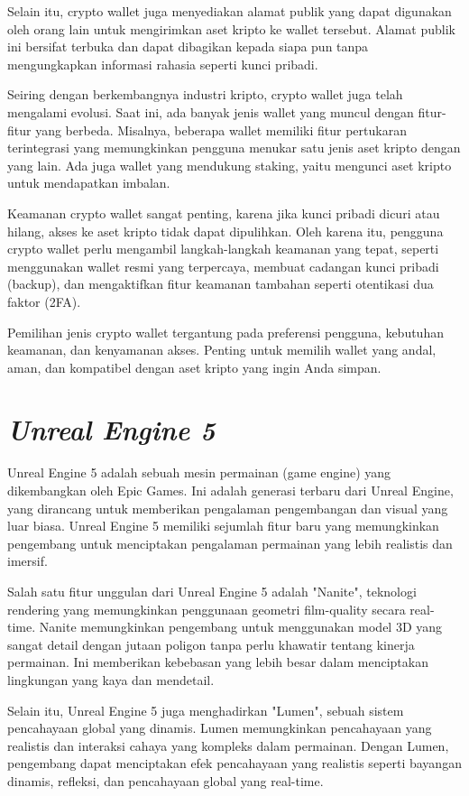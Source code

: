 Selain itu, crypto wallet juga menyediakan alamat publik yang dapat digunakan oleh orang lain untuk mengirimkan aset kripto ke wallet tersebut. Alamat publik ini bersifat terbuka dan dapat dibagikan kepada siapa pun tanpa mengungkapkan
informasi rahasia seperti kunci pribadi.

Seiring dengan berkembangnya industri kripto, crypto wallet juga telah mengalami evolusi. Saat ini, ada banyak jenis wallet yang muncul dengan fitur-fitur yang berbeda. Misalnya, beberapa wallet memiliki fitur pertukaran terintegrasi
yang memungkinkan pengguna menukar satu jenis aset kripto dengan yang lain. Ada juga wallet yang mendukung staking, yaitu mengunci aset kripto untuk mendapatkan imbalan.

Keamanan crypto wallet sangat penting, karena jika kunci pribadi dicuri atau hilang, akses ke aset kripto tidak dapat dipulihkan. Oleh karena itu, pengguna crypto wallet perlu mengambil langkah-langkah keamanan yang tepat, seperti
menggunakan wallet resmi yang terpercaya, membuat cadangan kunci pribadi (backup), dan mengaktifkan fitur keamanan tambahan seperti otentikasi dua faktor (2FA). \parencite{antonopoulos2014mastering}

Pemilihan jenis crypto wallet tergantung pada preferensi pengguna, kebutuhan keamanan, dan kenyamanan akses. Penting untuk memilih wallet yang andal, aman, dan kompatibel dengan aset kripto yang ingin Anda simpan.

\section{\emph{Unreal Engine 5}}
Unreal Engine 5 adalah sebuah mesin permainan (game engine) yang dikembangkan oleh Epic Games. Ini adalah generasi terbaru dari Unreal Engine, yang dirancang untuk memberikan pengalaman pengembangan dan visual yang luar biasa.
Unreal Engine 5 memiliki sejumlah fitur baru yang memungkinkan pengembang untuk menciptakan pengalaman permainan yang lebih realistis dan imersif.

Salah satu fitur unggulan dari Unreal Engine 5 adalah "Nanite", teknologi rendering yang memungkinkan penggunaan geometri film-quality secara real-time. Nanite memungkinkan pengembang untuk menggunakan model 3D yang sangat detail
dengan jutaan poligon tanpa perlu khawatir tentang kinerja permainan. Ini memberikan kebebasan yang lebih besar dalam menciptakan lingkungan yang kaya dan mendetail.

Selain itu, Unreal Engine 5 juga menghadirkan "Lumen", sebuah sistem pencahayaan global yang dinamis. Lumen memungkinkan pencahayaan yang realistis dan interaksi cahaya yang kompleks dalam permainan. Dengan Lumen, pengembang dapat
menciptakan efek pencahayaan yang realistis seperti bayangan dinamis, refleksi, dan pencahayaan global yang real-time. \parencite{unrealarchitecture}


